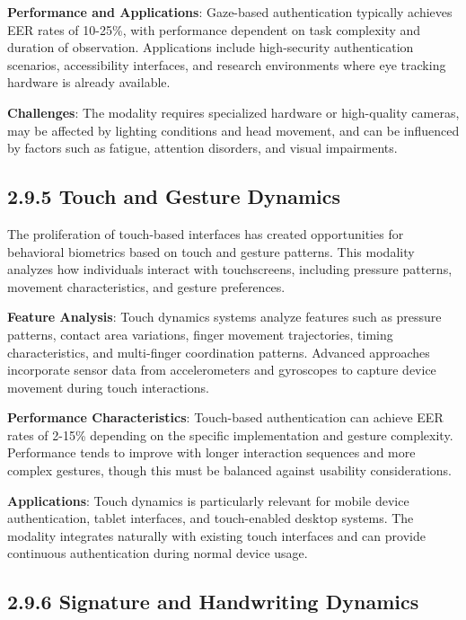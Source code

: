 \documentclass[
  12pt,
  a4paper,
]{report}
\begin{document}
\textbf{Performance and Applications}: Gaze-based authentication
typically achieves EER rates of 10-25\%, with performance dependent on
task complexity and duration of observation. Applications include
high-security authentication scenarios, accessibility interfaces, and
research environments where eye tracking hardware is already available.

\textbf{Challenges}: The modality requires specialized hardware or
high-quality cameras, may be affected by lighting conditions and head
movement, and can be influenced by factors such as fatigue, attention
disorders, and visual impairments.

\subsection{2.9.5 Touch and Gesture
Dynamics}\label{touch-and-gesture-dynamics}

The proliferation of touch-based interfaces has created opportunities
for behavioral biometrics based on touch and gesture patterns. This
modality analyzes how individuals interact with touchscreens, including
pressure patterns, movement characteristics, and gesture preferences.

\textbf{Feature Analysis}: Touch dynamics systems analyze features such
as pressure patterns, contact area variations, finger movement
trajectories, timing characteristics, and multi-finger coordination
patterns. Advanced approaches incorporate sensor data from
accelerometers and gyroscopes to capture device movement during touch
interactions.

\textbf{Performance Characteristics}: Touch-based authentication can
achieve EER rates of 2-15\% depending on the specific implementation and
gesture complexity. Performance tends to improve with longer interaction
sequences and more complex gestures, though this must be balanced
against usability considerations.

\textbf{Applications}: Touch dynamics is particularly relevant for
mobile device authentication, tablet interfaces, and touch-enabled
desktop systems. The modality integrates naturally with existing touch
interfaces and can provide continuous authentication during normal
device usage.

\subsection{2.9.6 Signature and Handwriting
Dynamics}\label{signature-and-handwriting-dynamics}
\end{document}
